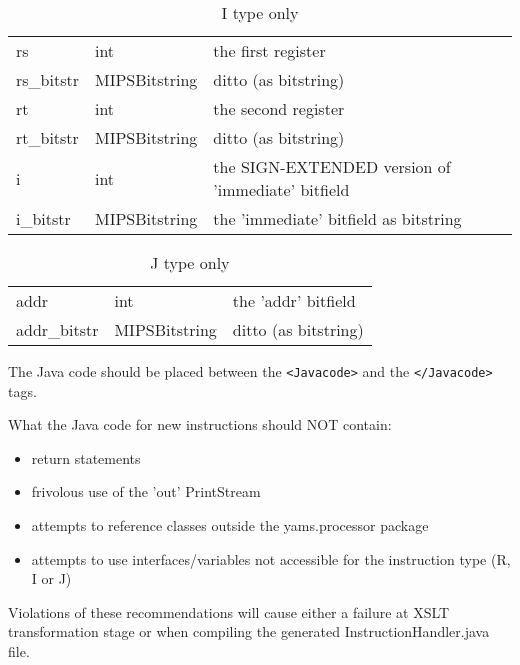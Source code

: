 \begin{enumerate}
\begin{table}
\begin{center}
	\begin{tabular}{|l|l|l|}
	\hline
	rs			&	int				&	the first register \\
	rs\_bitstr	&	MIPSBitstring	&	ditto (as bitstring) \\
	rt			&	int				&	the second register \\
	rt\_bitstr	&	MIPSBitstring	&	ditto (as bitstring) \\
	i			&	int				&	the SIGN-EXTENDED version of 'immediate' bitfield \\
	i\_bitstr	&	MIPSBitstring	&	the 'immediate' bitfield as bitstring \\
	\hline
	\end{tabular}
\caption{I type only}
\label{tab:IType}
\end{center}
\end{table}



\begin{table}
\begin{center}
	\begin{tabular}{|l|l|l|}
	\hline
	addr		&	int				&	the 'addr' bitfield \\
	addr\_bitstr	&	MIPSBitstring	&	ditto (as bitstring) \\
	\hline
	\end{tabular}
\caption{J type only}
\label{tab:JType}
\end{center}
\end{table}



The Java code should be placed between the \verb"<Javacode>" and the \verb"</Javacode>" tags.

What the Java code for new instructions should NOT contain:
\begin{itemize}
\item return statements
\item frivolous use of the 'out' PrintStream
\item attempts to reference classes outside the yams.processor package
\item attempts to use interfaces/variables not accessible for the instruction type (R, I or J)
\end{itemize}

Violations of these recommendations will cause either a failure at XSLT transformation stage or when compiling the generated InstructionHandler.java file.


\end{enumerate}
